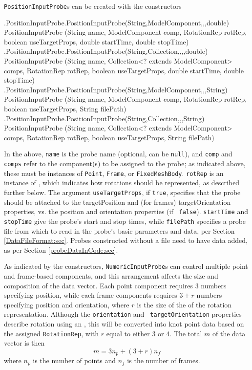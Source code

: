 {\tt PositionInputProbe}s can be created with the constructors
%
\begin{methodtable}{0.9}{0.1}
\midline
%
\methodentry
{\probes.PositionInputProbe.PositionInputProbe(String,ModelComponent,,,double)}%
{PositionInputProbe (String name, ModelComponent comp, RotationRep rotRep,\brh
boolean useTargetProps, double startTime, double stopTime)}%
{\ }%
%
\methodspace{0.5em}%
\methodentry
{\probes.PositionInputProbe.PositionInputProbe(String,Collection,,,,double)}%
{PositionInputProbe (String name, Collection<? extends ModelComponent> comps,\brh
RotationRep rotRep, 
boolean useTargetProps, double startTime, double stopTime)}%
{\ }%
%
\methodspace{0.5em}%
\methodentry
{\probes.PositionInputProbe.PositionInputProbe(String,ModelComponent,,,String)}%
{PositionInputProbe (String name, ModelComponent comp, RotationRep rotRep,\brh
boolean useTargetProps, String filePath)}%
{\ }%
%
\methodspace{0.5em}%
\methodentry
{\probes.PositionInputProbe.PositionInputProbe(String,Collection,,,String)}%
{PositionInputProbe (String name, Collection<? extends ModelComponent> comps,\brh
RotationRep rotRep, boolean useTargetProps, String filePath)}%
{\ }%
\midline
\end{methodtable}
%
In the above, {\tt name} is the probe name (optional, can be {\tt null}), and
{\tt comp} and {\tt comps} refer to the component(s) to be assigned to the
probe; as indicated above, these must be instances of {\tt Point}, {\tt Frame},
or {\tt FixedMeshBody}. {\tt rotRep} is an instance of 
, which indicates 
how rotations should be represented, as described further below.  The argument
{\tt useTargetProps}, if {\tt true}, specifies that the probe should be
attached to the {\sf targetPosition} and (for frames) {\sf targetOrientation}
properties, vs. the {\sf position} and {\sf orientation} properties (if {\tt
false}). {\tt startTime} and {\tt stopTime} give the probe's start and stop
times, while {\tt filePath} specifies a probe file from which to read in the
probe's basic parameters and data, per Section \ref{DataFileFormat:sec}.  Probes
constructed without a file need to have data added, as per Section
\ref{probeDataInCode:sec}.

As indicated by the constructors, {\tt NumericInputProbe}s can control multiple
point and frame-based components, and this arrangement affects the size and
composition of the data vector. Each point component requires 3 numbers
specifying position, while each frame components requires $3 + r$ numbers
specifying position and orientation, where $r$ is the size of the of the
rotation representation. Although the {\tt orientation} and {\tt
targetOrientation} properties describe rotation using an
, this will be converted
into knot point data based on the assigned {\tt RotationRep}, with $r$ equal to
either 3 or 4. The total $m$ of the data vector is then
%
\begin{equation*}
m = 3 n_p + (3 + r) n_f
\end{equation*}
%
where $n_p$ is the number of points and $n_f$ is the number of frames.

